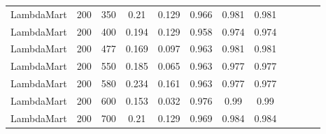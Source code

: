 \begin{longtable}{*{12}{c}}
LambdaMart & 200 & 350 & 0.21 & 0.129 & 0.966 & 0.981 & 0.981 \\ 
LambdaMart & 200 & 400 & 0.194 & 0.129 & 0.958 & 0.974 & 0.974 \\ 
LambdaMart & 200 & 477 & 0.169 & 0.097 & 0.963 & 0.981 & 0.981 \\ 
LambdaMart & 200 & 550 & 0.185 & 0.065 & 0.963 & 0.977 & 0.977 \\ 
LambdaMart & 200 & 580 & 0.234 & 0.161 & 0.963 & 0.977 & 0.977 \\ 
LambdaMart & 200 & 600 & 0.153 & 0.032 & 0.976 & 0.99 & 0.99 \\ 
LambdaMart & 200 & 700 & 0.21 & 0.129 & 0.969 & 0.984 & 0.984 \\ 
\end{longtable}